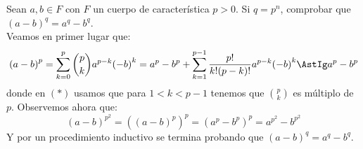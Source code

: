 \begin{ejercicio}\label{ej:cuerpo_caracteristica}
    Sean $a,b\in F$ con $F$ un cuerpo de característica $p>0$. Si $q=p^n$, comprobar que ${(a-b)}^{q} = a^q - b^q$.\\

    \noindent
    Veamos en primer lugar que:
    \begin{equation*}
        {(a-b)}^{p} = \sum_{k=0}^{p} \binom{p}{k} a^{p-k}{(-b)}^k = a^p - b^p + \sum_{k=1}^{p-1} \dfrac{p!}{k!(p-k)!}a^{p-k}{(-b)}^{k} \AstIg a^p - b^p
    \end{equation*}
    donde en $(\ast)$ usamos que para $1<k<p-1$ tenemos que $\binom{p}{k}$ es múltiplo de $p$. Observemos ahora que:
    \begin{equation*}
        {(a-b)}^{p^2} = {({(a-b)}^{p})}^{p} = {(a^p-b^p)}^{p} = a^{p^2} - b^{p^2}
    \end{equation*}
    Y por un procedimiento inductivo se termina probando que ${(a-b)}^{q} = a^q - b^q$.
\end{ejercicio}

